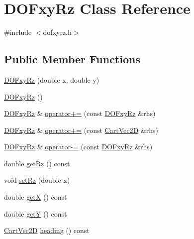 \hypertarget{class_d_o_fxy_rz}{}\section{D\+O\+Fxy\+Rz Class Reference}
\label{class_d_o_fxy_rz}


{\ttfamily \#include $<$dofxyrz.\+h$>$}

\subsection*{Public Member Functions}
\begin{DoxyCompactItemize}
\item 
\hyperlink{class_d_o_fxy_rz_a6f464ff9fa12b2d66c93415f079a003d}{D\+O\+Fxy\+Rz} (double x, double y)
\item 
\hyperlink{class_d_o_fxy_rz_afa374e4dff3b3a5916cf545b16f07596}{D\+O\+Fxy\+Rz} ()
\item 
\hyperlink{class_d_o_fxy_rz}{D\+O\+Fxy\+Rz} \& \hyperlink{class_d_o_fxy_rz_a043e442de5d6442ed7e582b9d5507b82}{operator+=} (const \hyperlink{class_d_o_fxy_rz}{D\+O\+Fxy\+Rz} \&rhs)
\item 
\hyperlink{class_d_o_fxy_rz}{D\+O\+Fxy\+Rz} \& \hyperlink{class_d_o_fxy_rz_a082af42b93a681708dec738e844356d8}{operator+=} (const \hyperlink{class_cart_vec2_d}{Cart\+Vec2D} \&rhs)
\item 
\hyperlink{class_d_o_fxy_rz}{D\+O\+Fxy\+Rz} \& \hyperlink{class_d_o_fxy_rz_ac6c8ca46b06727c79aa454ccbeb89b19}{operator-\/=} (const \hyperlink{class_d_o_fxy_rz}{D\+O\+Fxy\+Rz} \&rhs)
\item 
double \hyperlink{class_d_o_fxy_rz_ac82d85d1f14b1ee58df06cf3b3d15c17}{get\+Rz} () const 
\item 
void \hyperlink{class_d_o_fxy_rz_a1d9e60f0b34ead75b5bd08a18a3d3bc3}{set\+Rz} (double x)
\item 
double \hyperlink{class_d_o_fxy_rz_a9f40a00c3ac6b7d0bb5e6dff8e5505fe}{getX} () const 
\item 
double \hyperlink{class_d_o_fxy_rz_a9e61abd80baaefc6969d2d5264840365}{getY} () const 
\item 
\hyperlink{class_cart_vec2_d}{Cart\+Vec2D} \hyperlink{class_d_o_fxy_rz_a6b53b0cecd56e675e5f48e34a68d11e4}{heading} () const 
\end{DoxyCompactItemize}
